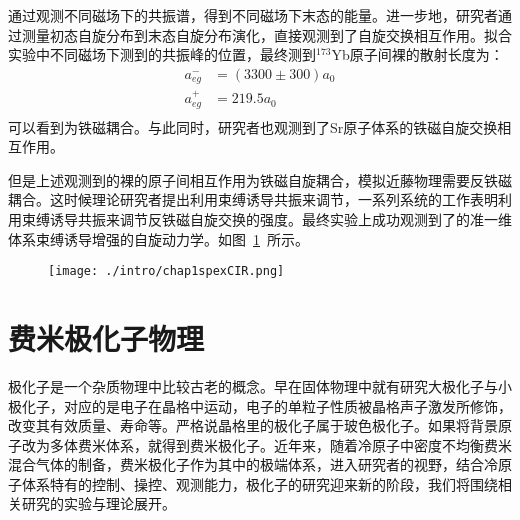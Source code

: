 通过观测不同磁场下的共振谱，得到不同磁场下末态的能量。进一步地，研究者通过测量初态自旋分布到末态自旋分布演化\cite{scazza2014observation,cappellini2014direct}，直接观测到了自旋交换相互作用。拟合实验中不同磁场下测到的共振峰的位置，最终测到${}^{173}$Yb原子间裸的散射长度为\cite{scazza2014observation,cappellini2014direct}：
\begin{equation}
\begin{split}
a_{e g}^{-}&=(3300 \pm 300) a_{0}\\
a_{e g}^{+}& = 219.5 a_0\\
\end{split}
\end{equation}
可以看到为铁磁耦合。与此同时，研究者也观测到了Sr原子体系的铁磁自旋交换相互作用\cite{zhang2014spectroscopic}。

但是上述观测到的裸的原子间相互作用为铁磁自旋耦合，模拟近藤物理需要反铁磁耦合。这时候理论研究者提出利用束缚诱导共振来调节，一系列系统的工作表明利用束缚诱导共振来调节反铁磁自旋交换的强度\cite{zhang2016kondo,cheng2017enhancing,zhang2018control,ji2018confinement,zhang2020tight,zhang2020controlling}。最终实验上成功观测到了的准一维体系束缚诱导增强的自旋动力学\cite{riegger2018localized}。如图~\ref{CIRspexexp}~所示。
\begin{figure}[!htbp]
    \centering
    \texttt{[image: ./intro/chap1spexCIR.png]}
    \label{CIRspexexp}
\end{figure}












\section{费米极化子物理}\label{1sec:polaron}
极化子是一个杂质物理中比较古老的概念。早在固体物理中就有研究大极化子与小极化子\cite{landau1933bewegung,pekar1946autolocalization,frohlich1950xx,frohlich1954electrons,feynman1955slow,mahanmany}，对应的是电子在晶格中运动，电子的单粒子性质被晶格声子激发所修饰，改变其有效质量、寿命等。严格说晶格里的极化子属于玻色极化子。如果将背景原子改为多体费米体系，就得到费米极化子。近年来，随着冷原子中密度不均衡费米混合气体的制备，费米极化子作为其中的极端体系，进入研究者的视野，结合冷原子体系特有的控制、操控、观测能力，极化子的研究迎来新的阶段，我们将围绕相关研究的实验与理论展开。


